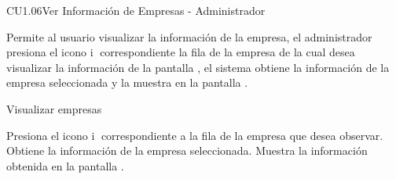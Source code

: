 \begin{UseCase}{CU1.06}{Ver Información de Empresas - Administrador }{
    Permite al usuario  visualizar la información de la empresa, el administrador presiona el icono \textcircled{i} correspondiente la fila de la empresa de la cual desea visualizar la información de la pantalla , el sistema obtiene la información de la empresa seleccionada y la muestra en la pantalla .
    
    
    
    \bigskip
}
		
\end{UseCase}
	
	\begin{UCtrayectoria}{Visualizar empresas }
	
		\UCpaso[\UCactor] Presiona el icono \textcircled{i} correspondiente a la fila de la empresa que desea observar.
		\UCpaso[\UCsist] Obtiene la información de la empresa seleccionada.
		\UCpaso[\UCsist] Muestra la información obtenida en la pantalla .
       
		
	\end{UCtrayectoria}

